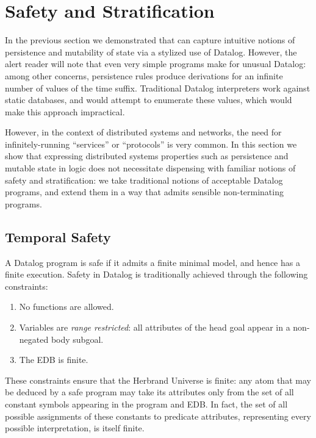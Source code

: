 \section{Safety and Stratification}

In the previous section we demonstrated that \slang can capture intuitive
notions of persistence and mutability of state via a stylized use of Datalog.
However, the alert reader will note that even very simple \slang programs make
for unusual Datalog: among other concerns, persistence rules produce
derivations for an infinite number of values of the time suffix.
Traditional Datalog interpreters work against static databases, and would attempt to enumerate these values, which would make this approach impractical.  

However,
in the context of distributed systems and networks, the need for
infinitely-running ``services'' or ``protocols'' is very common.  In this
section we show that expressing distributed systems properties such as
persistence and mutable state in logic does not necessitate dispensing with
familiar notions of safety and stratification: we take traditional notions of
acceptable Datalog programs, and extend them in a way that admits sensible
non-terminating programs.

\subsection{Temporal Safety}
A Datalog program is safe if it admits a finite minimal model, and hence has
a finite execution.  Safety in Datalog is traditionally achieved
through the following constraints:

\begin{enumerate}
%
\item No functions are allowed.
%
\item Variables are \emph{range restricted}: all attributes of the head goal
appear in a non-negated body subgoal.
%
\item The EDB is finite.
%
\end{enumerate}

These constraints ensure that the Herbrand Universe is finite: any atom that
may be deduced by a safe program may take its attributes only from the 
set of all constant symbols appearing in the program and EDB.
In fact, the set of all possible assignments of these constants to predicate
attributes, representing every possible interpretation, is itself finite. 

